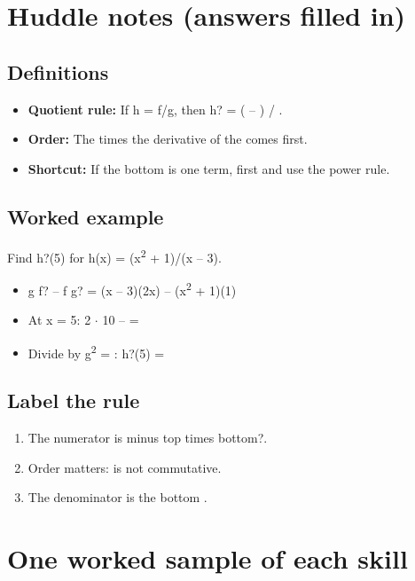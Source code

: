 \documentclass[11pt]{article}
\begin{document}
\section*{Huddle notes (answers filled in)}
\subsection*{Definitions}\begin{itemize}
\item \textbf{Quotient rule:} If h = f/g, then h? = ( -- ) / .
\item \textbf{Order:} The  times the derivative of the  comes first.
\item \textbf{Shortcut:} If the bottom is one term,  first and use the power rule.
\end{itemize}
\subsection*{Worked example}
Find h?(5) for h(x) = (x\textsuperscript{2} + 1)/(x -- 3).\\
\begin{itemize}
\item g f? -- f g? = (x -- 3)(2x) -- (x\textsuperscript{2} + 1)(1)
\item At x = 5: 2 $\cdot$ 10 --  = 
\item Divide by g\textsuperscript{2} = : h?(5) = 
\end{itemize}
\subsection*{Label the rule}
\begin{enumerate}
\item The numerator is  minus top times bottom?.
\item Order matters:  is not commutative.
\item The denominator is the bottom .
\end{enumerate}
\section*{One worked sample of each skill}
\end{document}
